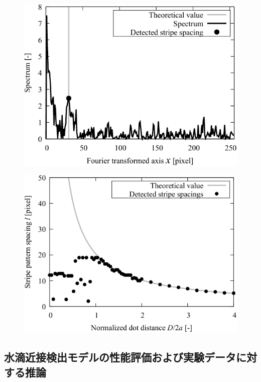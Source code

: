 \begin{figure}[htbp!]
    \centering
    \includegraphics[width=0.8\linewidth]{./Figure/4_Results/stripe_pattern_experiment/stripe_pattern_exp_exam_peak.pdf}
    \caption{}
    \label{fig:stripePatternExperiment}
\end{figure}

\begin{figure}[htbp!]
    \centering
    \includegraphics[width=0.8\linewidth]{./Figure/4_Results/stripe_pattern_experiment/stripe_pattern_exp_final_result.pdf}
    \caption{}
    \label{fig:stripePatternExperiment}
\end{figure}



\subsection{水滴近接検出モデルの性能評価および実験データに対する推論}

